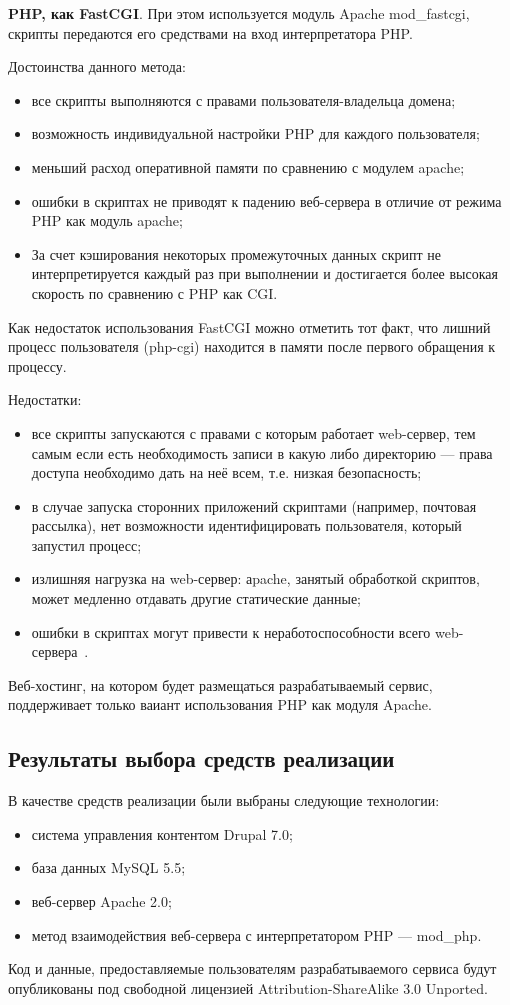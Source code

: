 \textbf{PHP, как FastCGI}. При этом используется модуль Apache mod\_fastcgi,
скрипты передаются его средствами на вход интерпретатора PHP.

Достоинства данного метода:
\begin{itemize}
\item
  все скрипты выполняются с правами пользователя-владельца домена;
\item
  возможность индивидуальной настройки PHP для каждого пользователя;
\item
  меньший расход оперативной памяти по сравнению с модулем apache;
\item
  ошибки в скриптах не приводят к падению веб-сервера в отличие от режима PHP как модуль apache;
\item
  За счет кэширования некоторых промежуточных данных скрипт не интерпретируется каждый раз при выполнении
  и достигается более высокая скорость по сравнению с PHP как CGI.
\end{itemize}

Как недостаток использования FastCGI можно отметить тот факт, что лишний процесс пользователя (php-cgi)
находится в памяти после первого обращения к процессу.

Недостатки:
\begin{itemize}
\item все скрипты запускаются с правами с которым работает web-сервер, 
  тем самым если есть необходимость записи в какую либо директорию --- права доступа необходимо дать на неё всем,
  т.е. низкая безопасность;
\item
  в случае запуска сторонних приложений скриптами (например, почтовая рассылка), нет возможности идентифицировать пользователя,
  который запустил процесс;
\item
  излишняя нагрузка на web-сервер: аpache, занятый обработкой скриптов, может медленно отдавать другие статические данные;
\item
  ошибки в скриптах могут привести к неработоспособности всего web-сервера~\cite{komtet_php_conf}.
\end{itemize}

Веб-хостинг, на котором будет размещаться разрабатываемый сервис, поддерживает только ваиант использования PHP как модуля
Apache.

\subsection{Результаты выбора средств реализации}
\label{ssec:choice_results}

В качестве средств реализации были выбраны следующие технологии:
\begin{itemize}
\item система управления контентом Drupal 7.0;
\item база данных MySQL 5.5;
\item веб-сервер Apache 2.0;
\item метод взаимодействия веб-сервера с интерпретатором PHP --- mod\_php.

\end{itemize}

Код и данные, предоставляемые пользователям разрабатываемого сервиса будут опубликованы 
под свободной лицензией Attribution-ShareAlike 3.0 Unported.